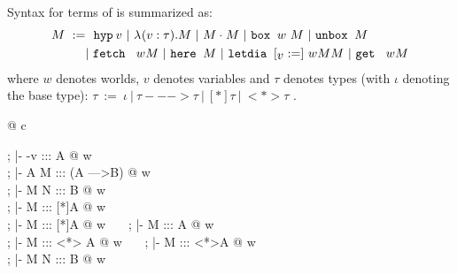 Syntax for terms of \langL{} is summarized as:
\begin{align*}
M ~:=&~~ \hyp {\varbr} ~|~ \lam{\varbr{}}{\tau} M ~|~ \appl{M}{M} ~|~ \bbox{\worldbr{}} M ~|~ \unbox{} M \\
	&|~ \fetch \worldbr{} M ~|~ \here M ~|~ \letdia \varbr{} \worldbr{} M M ~|~ \get \worldbr{} M
\end{align*}
where $w$ denotes worlds, $v$ denotes variables and $\tau$ denotes types (with $\iota$ denoting the base type):
$\tau ~:=~ \iota ~|~ \tau ---> \tau ~|~ [*] \tau ~|~ <*> \tau$ .

\begin{center}
\footnotesize
\begin{spacing}{3}
\begin{tabular}{@{} c }

			    {\Omega; \Gamma |- \hyp{v} ::: A @ w}\\

			    {\Omega; \Gamma |-  A M ::: (A --->B) @ w}\\

			     {\Omega; \Gamma |- \appl M N ::: B @ w}\\

			     {\Omega; \Gamma |-  M ::: [*]A @ w}\\

			      {\Omega; \Gamma |-  M ::: [*]A @ w}~~~
				 {\Omega; \Gamma |- \unbox M ::: A @ w}\\

			     {\Omega; \Gamma |- \here M ::: <*> A @ w}~~~
 			    {\Omega; \Gamma |-  M ::: <*>A @ w}\\

	{\Omega; \Gamma |-  M N ::: B @ w}
\end{tabular}
\end{spacing}
\normalsize
\end{center}

